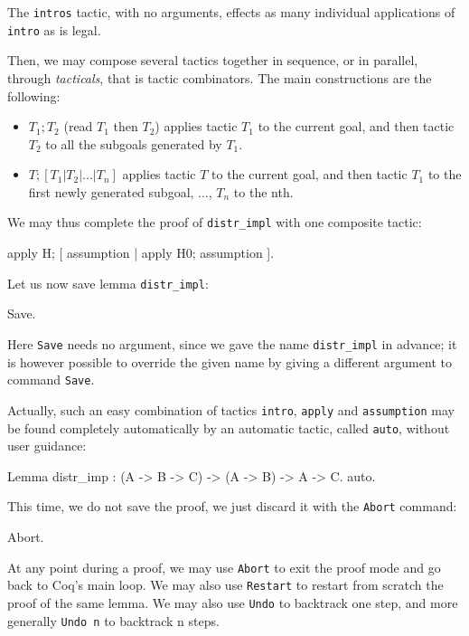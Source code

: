 \documentclass[11pt,a4paper]{book}
\begin{document}
The \verb:intros: tactic, with no arguments, effects as many individual
applications of \verb:intro: as is legal.

Then, we may compose several tactics together in sequence, or in parallel,
through {\sl tacticals}, that is tactic combinators. The main constructions
are the following:
\begin{itemize}
\item $T_1 ; T_2$ (read $T_1$ then $T_2$) applies tactic $T_1$ to the current
goal, and then tactic $T_2$ to all the subgoals generated by $T_1$.
\item $T; [T_1 | T_2 | ... | T_n]$ applies tactic $T$ to the current
goal, and then tactic $T_1$ to the first newly generated subgoal, 
..., $T_n$ to the nth.
\end{itemize}

We may thus complete the proof of \verb:distr_impl: with one composite tactic:
\begin{coq_example}
apply H; [ assumption | apply H0; assumption ].
\end{coq_example}

Let us now save lemma \verb:distr_impl::
\begin{coq_example}
Save.
\end{coq_example}

Here \verb:Save: needs no argument, since we gave the name \verb:distr_impl: 
in advance;
it is however possible to override the given name by giving a different 
argument to command \verb:Save:.

Actually, such an easy combination of tactics \verb:intro:, \verb:apply:
and \verb:assumption: may be found completely automatically by an automatic
tactic, called \verb:auto:, without user guidance:
\begin{coq_example}
Lemma distr_imp : (A -> B -> C) -> (A -> B) -> A -> C.
auto.
\end{coq_example}

This time, we do not save the proof, we just discard it with the \verb:Abort: 
command:

\begin{coq_example}
Abort.
\end{coq_example}

At any point during a proof, we may use \verb:Abort: to exit the proof mode
and go back to Coq's main loop. We may also use \verb:Restart: to restart
from scratch the proof of the same lemma. We may also use \verb:Undo: to
backtrack one step, and more generally \verb:Undo n: to
backtrack n steps.
\end{document}
